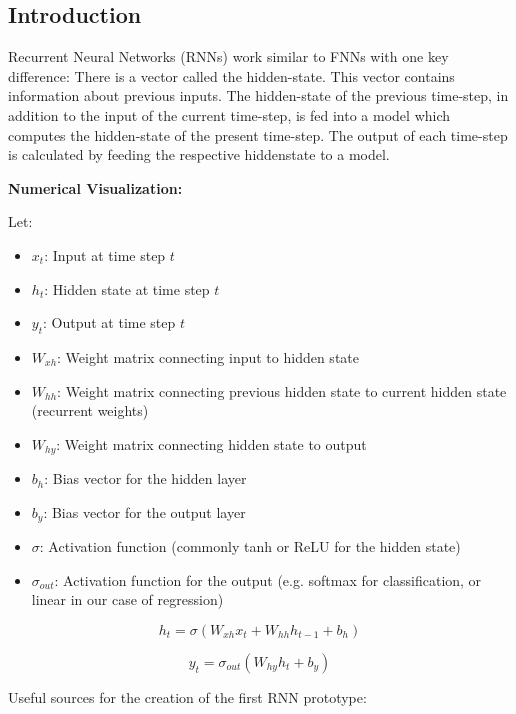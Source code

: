 \documentclass{article}
\begin{document}
\subsection{Introduction}
Recurrent Neural Networks (RNNs) work similar to FNNs with one key 
difference: There is a vector called the hidden-state. This vector contains 
information about previous inputs. The hidden-state of the previous 
time-step, in addition to the input of the current time-step, is fed into a 
model which computes the hidden-state of the present time-step. The output 
of each time-step is calculated by feeding the respective hiddenstate to a 
model.

\newpage
\textbf{ Numerical Visualization:}


Let:
\begin{itemize}
    \item $x_t$: Input at time step $t$
    \item $h_t$: Hidden state at time step $t$
    \item $y_t$: Output at time step $t$
    \item $W_{xh}$: Weight matrix connecting input to hidden state
    \item $W_{hh}$: Weight matrix connecting previous hidden state to current hidden state (recurrent weights)
    \item $W_{hy}$: Weight matrix connecting hidden state to output
    \item $b_h$: Bias vector for the hidden layer
    \item $b_y$: Bias vector for the output layer
    \item $\sigma$: Activation function (commonly tanh or ReLU for the hidden state)
    \item $\sigma_{out}$: Activation function for the output (e.g. softmax for classification, or linear in our case of regression)
\end{itemize}



$$h_t = \sigma(W_{xh}x_t + W_{hh}h_{t-1} + b_h)$$

$$y_t = \sigma_{out}(W_{hy}h_t + b_y)$$



Useful sources for the creation of the first RNN prototype:
\newpage




\printbibliography[heading=bibintoc]
\end{document}
